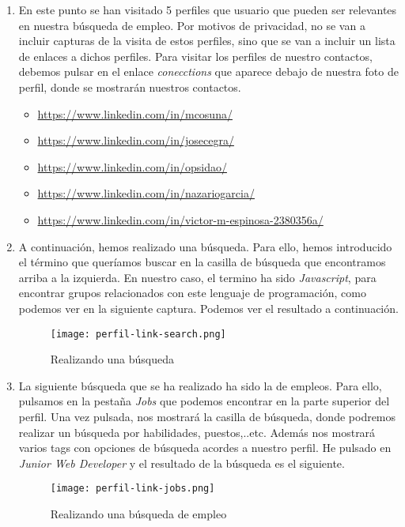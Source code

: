 \begin{enumerate}
    \item En este punto se han visitado 5 perfiles que usuario que pueden ser relevantes en nuestra búsqueda de empleo. Por motivos de privacidad, no se van a incluir capturas de la visita de estos perfiles, sino que se van a incluir un lista de enlaces a dichos perfiles. Para visitar los perfiles de nuestro contactos, debemos pulsar en el enlace \textit{conecctions} que aparece debajo de nuestra foto de perfil, donde se mostrarán nuestros contactos.

    \begin{itemize}
        \item \url{https://www.linkedin.com/in/mcosuna/}
        \item \url{https://www.linkedin.com/in/josecegra/}
        \item \url{https://www.linkedin.com/in/opsidao/}
        \item \url{https://www.linkedin.com/in/nazariogarcia/}
        \item \url{https://www.linkedin.com/in/victor-m-espinosa-2380356a/}
    \end{itemize}

    \item A continuación, hemos realizado una búsqueda. Para ello, hemos introducido el término que queríamos buscar en la casilla de búsqueda que encontramos arriba a la izquierda. En nuestro caso, el termino ha sido \textit{Javascript}, para encontrar grupos relacionados con este lenguaje de programación, como podemos ver en la siguiente captura. Podemos ver el resultado a continuación.

        \begin{figure}[H]
        \centering
        \texttt{[image: perfil-link-search.png]}
        \caption{Realizando una búsqueda}
    \end{figure}

    \item La siguiente búsqueda que se ha realizado ha sido la de empleos.  Para ello, pulsamos en la pestaña \textit{Jobs} que podemos encontrar en la parte superior del perfil. Una vez pulsada, nos mostrará la casilla de búsqueda, donde podremos realizar un búsqueda por habilidades, puestos,..etc. Además nos mostrará varios tags con opciones de búsqueda acordes a nuestro perfil. He pulsado en \textit{Junior Web Developer} y el resultado de la búsqueda es el siguiente.

    \begin{figure}[H]
        \centering
        \texttt{[image: perfil-link-jobs.png]}
        \caption{Realizando una búsqueda de empleo}
    \end{figure}


\end{enumerate}
